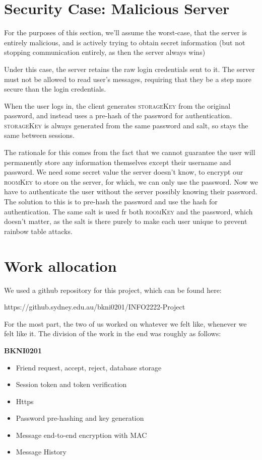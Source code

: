 \documentclass[12pt]{article}
\newcommand{\bryce}{\hfill\normalsize\sc [bkni0201]}
\newcommand{\rkey}{\textsc{roomKey} }
\newcommand{\skey}{\textsc{storageKey} }
\begin{document}
\section[Case: Malicious Server]{Security Case: Malicious Server \bryce}

For the purposes of this section, we'll assume the worst-case, that the server is entirely malicious, and is actively trying to obtain secret information (but not stopping communication entirely, as then the server always wins)

Under this case, the server retains the raw login credentials sent to it. The server must not be allowed to read user's messages, requiring that they be a step more secure than the login credentials.

When the user logs in, the client generates \skey from the original password, and instead uses a pre-hash of the password for authentication. \skey is always generated from the same password and salt, so stays the same between sessions.

The rationale for this comes from the fact that we cannot guarantee the user will permanently store any information themselves except their username and password. We need some secret value the server doesn't know, to encrypt our \rkey to store on the server, for which, we can only use the password. Now we have to authenticate the user without the server possibly knowing their password. The solution to this is to pre-hash the password and use the hash for authentication. The same salt is used fr both \rkey and the password, which doesn't matter, as the salt is there purely to make each user unique to prevent rainbow table attacks.

\section{Work allocation}

We used a github repository for this project, which can be found here:

https://github.sydney.edu.au/bkni0201/INFO2222-Project

For the most part, the two of us worked on whatever we felt like, whenever we felt like it. The division of the work in the end was roughly as follows:

\textbf{BKNI0201}

\begin{itemize}
\item Friend request, accept, reject, database storage
\item Session token and token verification
\item Https
\item Password pre-hashing and key generation
\item Message end-to-end encryption with MAC
\item Message History
\end{itemize}
\end{document}
